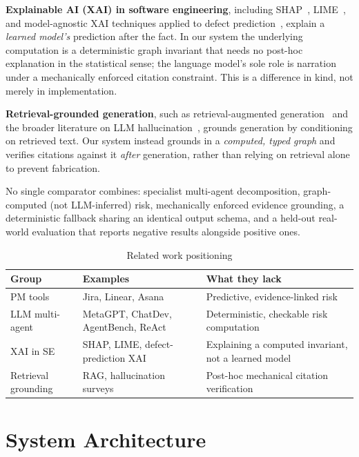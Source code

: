 \documentclass[conference]{IEEEtran}
\begin{document}
\textbf{Explainable AI (XAI) in software engineering}, including SHAP~\cite{shap},
LIME~\cite{lime}, and model-agnostic XAI techniques applied to defect
prediction~\cite{jiarpakdee}, explain a \emph{learned model's} prediction after the
fact. In our system the underlying computation is a deterministic graph invariant
that needs no post-hoc explanation in the statistical sense; the language model's
sole role is narration under a mechanically enforced citation constraint. This is a
difference in kind, not merely in implementation.

\textbf{Retrieval-grounded generation}, such as retrieval-augmented
generation~\cite{rag} and the broader literature on LLM hallucination~\cite{hallucination-survey},
grounds generation by conditioning on retrieved text. Our system instead grounds in
a \emph{computed, typed graph} and verifies citations against it \emph{after}
generation, rather than relying on retrieval alone to prevent fabrication.

No single comparator combines: specialist multi-agent decomposition, graph-computed
(not LLM-inferred) risk, mechanically enforced evidence grounding, a deterministic
fallback sharing an identical output schema, and a held-out real-world evaluation
that reports negative results alongside positive ones.

\begin{table}[t]
\caption{Related work positioning}
\label{tab:related}
\centering
\begin{tabular}{p{1.6cm}p{2.7cm}p{3.2cm}}
\toprule
\textbf{Group} & \textbf{Examples} & \textbf{What they lack} \\
\midrule
PM tools & Jira, Linear, Asana & Predictive, evidence-linked risk \\
LLM multi-agent & MetaGPT, ChatDev, AgentBench, ReAct & Deterministic, checkable risk computation \\
XAI in SE & SHAP, LIME, defect-prediction XAI & Explaining a computed invariant, not a learned model \\
Retrieval grounding & RAG, hallucination surveys & Post-hoc mechanical citation verification \\
\bottomrule
\end{tabular}
\end{table}

\section{System Architecture}
\end{document}
